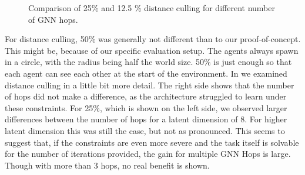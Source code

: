 \begin{figure}[htp]
    \centering
    \hspace{1cm}                       
    \caption{Comparison of 25$\%$ and 12.5 $\%$ distance culling for different number of GNN hops.}
    \label{fig:observation-distancecompare}
\end{figure}

For distance culling, 50$\%$ was generally not different than to our proof-of-concept. This might be, because of our specific evaluation setup. The agents always spawn in a circle, with the radius being half the world size. 50$\%$ is just enough so that each agent can see each other at the start of the environment.
In  we examined distance culling in a little bit more detail. The right side shows that the number of hops did not make a difference, as the architecture struggled to learn under these constraints. For 25$\%$, which is shown on the left side, we observed larger differences between the number of hops for a latent dimension of 8. For higher latent dimension this was still the case, but not as pronounced. This seems to suggest that, if the constraints are even more severe and the task itself is solvable for the number of iterations provided, the gain for multiple GNN Hops is large. Though with more than 3 hops, no real benefit is shown.


